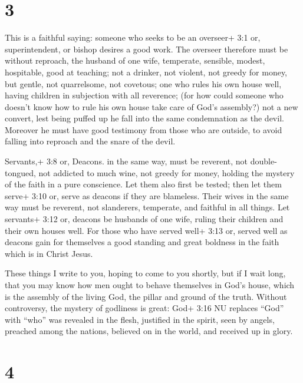 \hypertarget{section-2}{%
\section{3}\label{section-2}}

 This is a faithful saying: someone who seeks to be an
overseer+ 3:1 or, superintendent, or bishop desires a good work.
 The overseer therefore must be without reproach, the
husband of one wife, temperate, sensible, modest, hospitable, good at
teaching;  not a drinker, not violent, not greedy for money,
but gentle, not quarrelsome, not covetous;  one who rules
his own house well, having children in subjection with all reverence;
 (for how could someone who doesn't know how to rule his own
house take care of God's assembly?)  not a new convert, lest
being puffed up he fall into the same condemnation as the devil.
 Moreover he must have good testimony from those who are
outside, to avoid falling into reproach and the snare of the devil.

 Servants,+ 3:8 or, Deacons. in the same way, must be
reverent, not double-tongued, not addicted to much wine, not greedy for
money,  holding the mystery of the faith in a pure
conscience.  Let them also first be tested; then let them
serve+ 3:10 or, serve as deacons if they are blameless. 
Their wives in the same way must be reverent, not slanderers, temperate,
and faithful in all things.  Let servants+ 3:12 or, deacons
be husbands of one wife, ruling their children and their own houses
well.  For those who have served well+ 3:13 or, served well
as deacons gain for themselves a good standing and great boldness in the
faith which is in Christ Jesus.

 These things I write to you, hoping to come to you
shortly,  but if I wait long, that you may know how men
ought to behave themselves in God's house, which is the assembly of the
living God, the pillar and ground of the truth.  Without
controversy, the mystery of godliness is great: God+ 3:16 NU replaces
``God'' with ``who'' was revealed in the flesh, justified in the spirit,
seen by angels, preached among the nations, believed on in the world,
and received up in glory.

\hypertarget{section-3}{%
\section{4}\label{section-3}}

